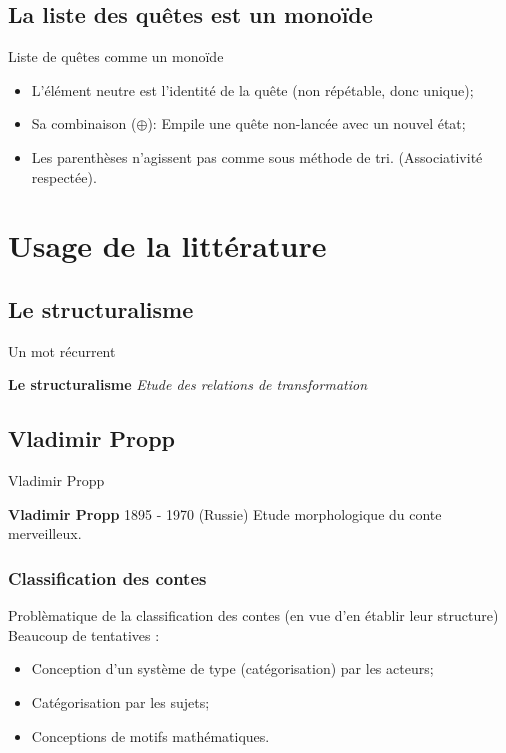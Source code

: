 \documentclass{beamer}
\begin{document}
\subsection{La liste des quêtes est un  monoïde}
\begin{frame}{Liste de quêtes comme un monoïde}
  \begin{itemize}
    \item L'élément neutre est l'identité de la quête (non répétable, donc unique);
    \item Sa combinaison ($\oplus$): Empile une quête non-lancée avec un nouvel état;
    \item Les parenthèses n'agissent pas comme sous méthode de tri. (Associativité respectée).
  \end{itemize}
\end{frame}

\section{Usage de la littérature}
\subsection{Le structuralisme}
\begin{frame}{Un mot récurrent}
  \begin{center}
    \begin{block}{\textbf{Le structuralisme}}
      \textit{Etude des relations de transformation}
    \end{block}
  \end{center}
\end{frame}

\subsection{Vladimir Propp}
\begin{frame}{Vladimir Propp}
  \begin{block}{\textbf{Vladimir Propp} 1895 - 1970 (Russie)}
    Etude morphologique du conte merveilleux.
  \end{block}
\end{frame}

\subsubsection{Classification des contes}
\begin{frame}{Problèmatique de la classification des contes (en vue d'en établir leur structure)}
  Beaucoup de tentatives :
  \begin{itemize}
    \item Conception d'un système de type (catégorisation) par les acteurs;
    \item Catégorisation par les sujets;
    \item Conceptions de motifs mathématiques.
  \end{itemize}
\end{frame}
\end{document}
